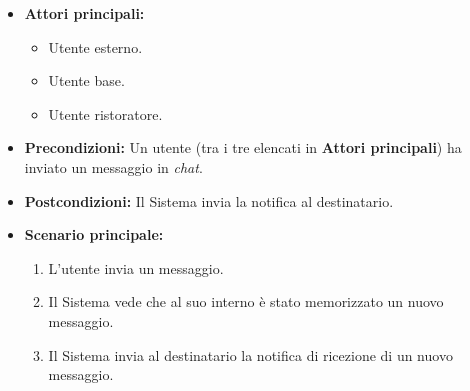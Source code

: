\label{usecase:Notifica chat}
\begin{itemize}
    \item \textbf{Attori principali:} 
	\begin{itemize}
        \item Utente esterno.
        \item Utente base.
        \item Utente ristoratore.
    \end{itemize}
	
	\item \textbf{Precondizioni:}  Un utente (tra i tre elencati in \textbf{Attori principali}) ha inviato un messaggio in \textit{chat}.

	\item \textbf{Postcondizioni:} Il Sistema invia la notifica al destinatario.
     
	\item \textbf{Scenario principale:}
	      \begin{enumerate}
                \item L'utente invia un messaggio.
                \item Il Sistema vede che al suo interno è stato memorizzato un nuovo messaggio.
                \item Il Sistema invia al destinatario la notifica di ricezione di un nuovo messaggio.
	      \end{enumerate}
\end{itemize}